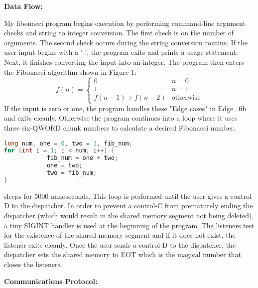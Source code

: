 \documentclass{article}
\begin{document}
\begin{flushleft}
\textbf{Data Flow:}
\vspace{.5pc}
\end{flushleft}

My fibonacci program begins execution by performing command-line argument 
checks and string to integer conversion.  The first check is on the number of 
arguments.  The second check occurs during the string conversion routine.  If 
the user input begins with a '-', the program exits and prints a usage 
statement.  Next, it finishes converting the input into an integer. The 
program then enters the Fibonacci algorithm shown in Figure 1:
\begin{equation}
    f(n) = \begin{cases}
               0               & n = 0\\
               1               & n = 1\\
               f(n-1) + f(n-2) & \text{otherwise}
           \end{cases}
\end{equation}
If the input is zero or one, the program handles these "Edge cases" in
Edge\_fib and exits cleanly.  Otherwise the program continues into a loop 
where it uses three six-QWORD chunk numbers to calculate a desired Fibonacci
number.

\begin{lstlisting}[language=C, caption=Fibonacci in C]
long num, one = 0, two = 1, fib_num;
for (int i = 1; i < num; i++) {
            fib_num = one + two;
            one = two;
            two = fib_num;
}
\end{lstlisting}

sleeps for 5000 nanoseconds. This loop is performed until the user gives a 
control-D to the dispatcher. In order to prevent a control-C from prematurely
ending the dispatcher (which would result in the shared memory segment not
being deleted), a tiny SIGINT handler is used at the beginning of the program.
The listeners test for the existence of the shared memory segment and if it 
does not exist, the listener exits cleanly. Once the user sends a control-D to
the dispatcher, the dispatcher sets the shared memory to EOT which is the 
magical number that closes the listeners. 
\vspace{.5pc}

\begin{flushleft}
\textbf{Communications Protocol:}
\vspace{.5pc}
\end{flushleft}
\end{document}
